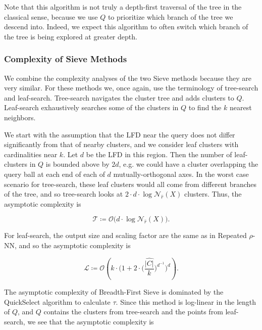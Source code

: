 Note that this algorithm is not truly a depth-first traversal of the tree in the classical sense, because we use $Q$ to prioritize which branch of the tree we descend into.
Indeed, we expect this algorithm to often switch which branch of the tree is being explored at greater depth.


\subsubsection{Complexity of Sieve Methods}
\label{sec:methods:knn-search:complexity-of-sieve-methods}

We combine the complexity analyses of the two Sieve methods because they are very similar.
For these methods we, once again, use the terminology of tree-search and leaf-search.
Tree-search navigates the cluster tree and adds clusters to $Q$.
Leaf-search exhaustively searches some of the clusters in $Q$ to find the $k$ nearest neighbors.

We start with the assumption that the LFD near the query does not differ significantly from that of nearby clusters, and we consider leaf clusters with cardinalities near $k$.
Let $d$ be the LFD in this region.
Then the number of leaf-clusters in $Q$ is bounded above by $2d$, e.g. we could have a cluster overlapping the query ball at each end of each of $d$ mutually-orthogonal axes.
In the worst case scenario for tree-search, these leaf clusters would all come from different branches of the tree, and so tree-search looks at $2 \cdot d \cdot \log \mathcal{N}_{\hat{r}}(X)$ clusters.
Thus, the asymptotic complexity is

\begin{equation*}
    \mathcal{T} \coloneqq \mathcal{O} \big( d \cdot \log \mathcal{N}_{\hat{r}}(X) \big).
\end{equation*}

For leaf-search, the output size and scaling factor are the same as in Repeated $\rho$-NN, and so the asymptotic complexity is

\begin{equation*}
    \mathcal{L} \coloneqq \mathcal{O} \left( k \cdot \bigg( 1 + 2 \cdot \Big( \frac{\hat{|C|}}{k} \Big) ^ {d^{-1}} \bigg)^d \right).
\end{equation*}

The asymptotic complexity of Breadth-First Sieve is dominated by the QuickSelect algorithm to calculate $\tau$.
Since this method is log-linear in the length of $Q$, and $Q$ contains the clusters from tree-search and the points from leaf-search, we see that the asymptotic complexity is

